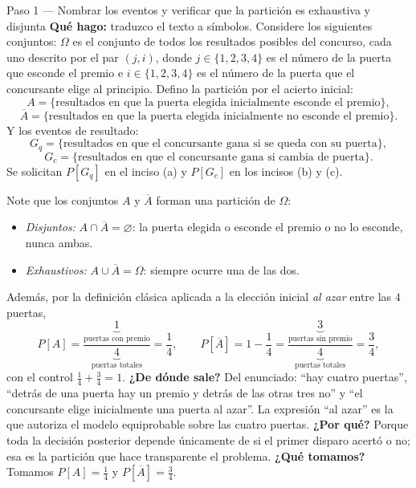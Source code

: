 \documentclass[11pt]{article}
\begin{document}
\begin{sol}

\begin{paso}{Paso 1 --- Nombrar los eventos y verificar que la partici\'on es exhaustiva y disjunta}
\textbf{Qu\'e hago:} traduzco el texto a s\'imbolos. Considere los siguientes conjuntos: $\Omega$ es el conjunto de todos los resultados posibles del concurso, cada uno descrito por el par $(j,i)$, donde $j\in\{1,2,3,4\}$ es el n\'umero de la puerta que esconde el premio e $i\in\{1,2,3,4\}$ es el n\'umero de la puerta que el concursante elige al principio. Defino la partici\'on por el acierto inicial:
\[
A=\{\text{resultados en que la puerta elegida inicialmente esconde el premio}\},
\]
\[
\overline{A}=\{\text{resultados en que la puerta elegida inicialmente no esconde el premio}\}.
\]
Y los eventos de resultado:
\[
G_{q}=\{\text{resultados en que el concursante gana si se queda con su puerta}\},
\]
\[
G_{c}=\{\text{resultados en que el concursante gana si cambia de puerta}\}.
\]
Se solicitan $P[G_{q}]$ en el inciso (a) y $P[G_{c}]$ en los incisos (b) y (c).

\medskip
Note que los conjuntos $A$ y $\overline{A}$ forman una partici\'on de $\Omega$:
\begin{itemize}[leftmargin=1.4em]
\item \emph{Disjuntos:} $A\cap\overline{A}=\varnothing$: la puerta elegida o esconde el premio o no lo esconde, nunca ambas.
\item \emph{Exhaustivos:} $A\cup\overline{A}=\Omega$: siempre ocurre una de las dos.
\end{itemize}
Adem\'as, por la definici\'on cl\'asica aplicada a la elecci\'on inicial \emph{al azar} entre las $4$ puertas,
\[
P[A]=\frac{\underbrace{1}_{\text{puertas con premio}}}{\underbrace{4}_{\text{puertas totales}}}=\frac14,
\qquad
P[\overline{A}]=1-\frac14=\frac{\underbrace{3}_{\text{puertas sin premio}}}{\underbrace{4}_{\text{puertas totales}}}=\frac34 ,
\]
con el control $\tfrac14+\tfrac34=1$.
\textbf{¿De d\'onde sale?} Del enunciado: ``hay cuatro puertas'', ``detr\'as de una puerta hay un premio y detr\'as de las otras tres no'' y ``el concursante elige inicialmente una puerta al azar''. La expresi\'on ``al azar'' es la que autoriza el modelo equiprobable sobre las cuatro puertas.
\textbf{¿Por qu\'e?} Porque toda la decisi\'on posterior depende \'unicamente de si el primer disparo acert\'o o no; esa es la partici\'on que hace transparente el problema.
\textbf{¿Qu\'e tomamos?} Tomamos $P[A]=\tfrac14$ y $P[\overline{A}]=\tfrac34$.
\end{paso}


\end{sol}
\end{document}
